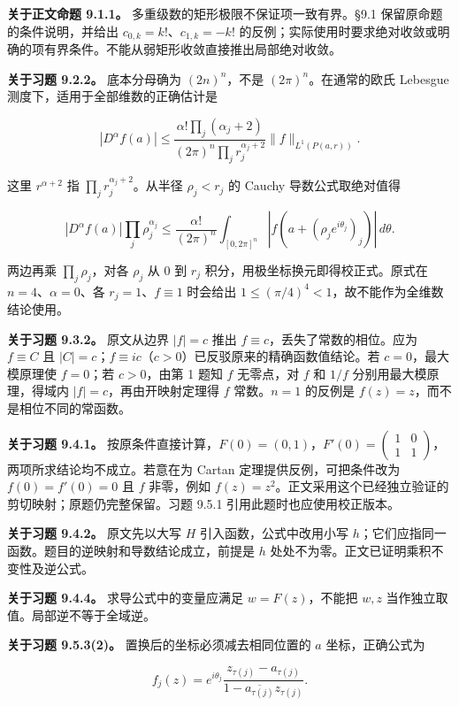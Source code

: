 \documentclass[11pt,a4paper]{article}
\begin{document}
\textbf{关于正文命题 9.1.1。} 多重级数的矩形极限不保证项一致有界。§9.1
保留原命题的条件说明，并给出 \(c_{0,k}=k!\)、\(c_{1,k}=-k!\)
的反例；实际使用时要求绝对收敛或明确的项有界条件。不能从弱矩形收敛直接推出局部绝对收敛。

\textbf{关于习题 9.2.2。} 底本分母确为 \((2n)^n\)，不是
\((2\pi)^n\)。在通常的欧氏 Lebesgue 测度下，适用于全部维数的正确估计是

\[
|D^\alpha f(a)|\le
\frac{\alpha!\prod_j(\alpha_j+2)}{(2\pi)^n\prod_j r_j^{\alpha_j+2}}
\|f\|_{L^1(P(a,r))}.
\]

这里 \(r^{\alpha+2}\) 指 \(\prod_jr_j^{\alpha_j+2}\)。从半径
\(\rho_j<r_j\) 的 Cauchy 导数公式取绝对值得

\[
|D^\alpha f(a)|\prod_j\rho_j^{\alpha_j}
\le\frac{\alpha!}{(2\pi)^n}
\int_{[0,2\pi]^n}|f(a+(\rho_je^{i\theta_j})_j)|\,d\theta.
\]

两边再乘 \(\prod_j\rho_j\)，对各 \(\rho_j\) 从 \(0\) 到 \(r_j\)
积分，用极坐标换元即得校正式。原式在 \(n=4\)、\(\alpha=0\)、各
\(r_j=1\)、\(f\equiv1\) 时会给出
\(1\le(\pi/4)^4<1\)，故不能作为全维数结论使用。

\textbf{关于习题 9.3.2。} 原文从边界 \(|f|=c\) 推出
\(f\equiv c\)，丢失了常数的相位。应为 \(f\equiv C\) 且
\(|C|=c\)；\(f\equiv ic\)（\(c>0\)）已反驳原来的精确函数值结论。若
\(c=0\)，最大模原理使 \(f=0\)；若 \(c>0\)，由第 1 题知 \(f\) 无零点，对
\(f\) 和 \(1/f\) 分别用最大模原理，得域内 \(|f|=c\)，再由开映射定理得
\(f\) 常数。\(n=1\) 的反例是 \(f(z)=z\)，而不是相位不同的常函数。

\textbf{关于习题 9.4.1。}
按原条件直接计算，\(F(0)=(0,1)\)，\(F'(0)=\begin{pmatrix}1&0\\1&1\end{pmatrix}\)，两项所求结论均不成立。若意在为
Cartan 定理提供反例，可把条件改为 \(f(0)=f'(0)=0\) 且 \(f\) 非零，例如
\(f(z)=z^2\)。正文采用这个已经独立验证的剪切映射；原题仍完整保留。习题
9.5.1 引用此题时也应使用校正版本。

\textbf{关于习题 9.4.2。} 原文先以大写 \(H\) 引入函数，公式中改用小写
\(h\)；它们应指同一函数。题目的逆映射和导数结论成立，前提是 \(h\)
处处不为零。正文已证明乘积不变性及逆公式。

\textbf{关于习题 9.4.4。} 求导公式中的变量应满足 \(w=F(z)\)，不能把
\(w,z\) 当作独立取值。局部逆不等于全域逆。

\textbf{关于习题 9.5.3(2)。} 置换后的坐标必须减去相同位置的 \(a\)
坐标，正确公式为

\[
f_j(z)=e^{i\theta_j}
\frac{z_{\tau(j)}-a_{\tau(j)}}{1-\overline{a_{\tau(j)}}z_{\tau(j)}}.
\]
\end{document}
